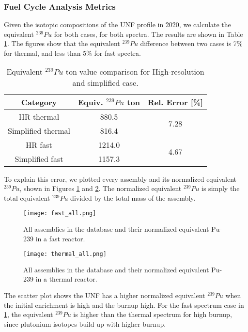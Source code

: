 \documentclass{anstrans}
\begin{document}
\subsubsection{Fuel Cycle Analysis Metrics}
Given the isotopic compositions of the \gls{UNF} profile in 2020,
we calculate the equivalent $^{239}Pu$ for both cases, for
both spectra. The results are shown in Table \ref{tab:equiv}.
The figures show that the equivalent
$^{239}Pu$ difference between two cases is 7\% for thermal,
and less than 5\% for fast spectra.

\begin{table}[h]
    \centering
    \begin{tabular}{ccc}
        \hline
        Category & Equiv. $^{239}Pu$ ton & Rel. Error [\%] \\
        \hline
        HR thermal & 880.5 & \multirow{2}{*}{7.28}\\
        Simplified thermal & 816.4\\
        \hline
        HR fast & 1214.0 & \multirow{2}{*}{4.67}\\
        Simplified fast & 1157.3 &\\
        \hline
    \end{tabular}
    \caption{Equivalent $^{239}Pu$ ton value comparison for High-resolution and simplified case.}
    \label{tab:equiv}
\end{table}

To explain this error, we plotted every assembly and its
normalized equivalent $^{239}Pu$, shown in Figures \ref{fig:fast_all} and \ref{fig:thermal_all}.
The normalized equivalent $^{239}Pu$ is simply the 
total equivalent $^{239}Pu$ divided by the total mass
of the assembly.

\begin{figure}
    \centering
    \texttt{[image: fast\_all.png]}
    \caption{All assemblies in the database and their normalized equivalent Pu-239 in a fast reactor.}
    \label{fig:fast_all}
\end{figure}

\begin{figure}
    \centering
    \texttt{[image: thermal\_all.png]}
    \caption{All assemblies in the database and their normalized equivalent Pu-239 in a thermal reactor.}
    \label{fig:thermal_all}
\end{figure}

The scatter plot shows the \gls{UNF}
has a higher normalized equivalent $^{239}Pu$ when the
initial enrichment is high and the burnup high. For the fast spectrum case in \ref{fig:fast_all}, the equivalent $^{239}Pu$ is higher than the thermal spectrum for high burnup, since plutonium isotopes 
build up with higher burnup.
\end{document}
